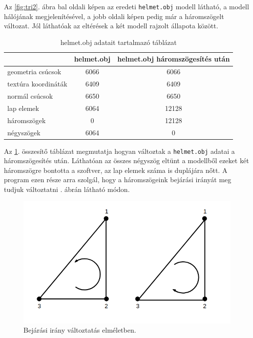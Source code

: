 Az \ref{fig:tri2}. ábra bal oldali képen az eredeti \texttt{helmet.obj} modell látható, a modell hálójának megjelenítésével, a jobb oldali képen pedig már a háromszögelt változat. Jól láthatóak az eltérések a két modell rajzolt állapota között.
\begin{table}[h]
\centering
\caption{helmet.obj adatait tartalmazó táblázat}
\bigskip
\label{tab:modellek}
\begin{tabular}{l|c|c|}
& helmet.obj & helmet.obj háromszögesítés után \\
\hline
geometria csúcsok & 6066 & 6066 \\
textúra koordináták & 6409 & 6409 \\
normál csúcsok & 6650 & 6650 \\
lap elemek & 6064 & 12128 \\
háromszögek & 0 & 12128 \\
négyszögek & 6064 & 0 \\
\hline
\end{tabular}
\label{fig:tri3}
\end{table}

Az \ref{fig:tri3}. összesítő táblázat megmutatja hogyan változtak a \texttt{helmet.obj} adatai a háromszögesítés után. Láthatóan az összes négyszög eltünt a modellből ezeket két háromszögre bontotta a szoftver, az lap elemek száma is duplájára nőtt.
\newpage
{}
\bigskip
A program ezen része arra szolgál, hogy a háromszögeink bejárási irányát meg tudjuk változtatni . ábrán látható módon.
\bigskip
\begin{figure}[h]
\centering
\includegraphics[scale=0.5]{images/bejarasi.png}
\caption{Bejárási irány változtatás elméletben.}
\label{fig:bej1}
\end{figure}
\bigskip

